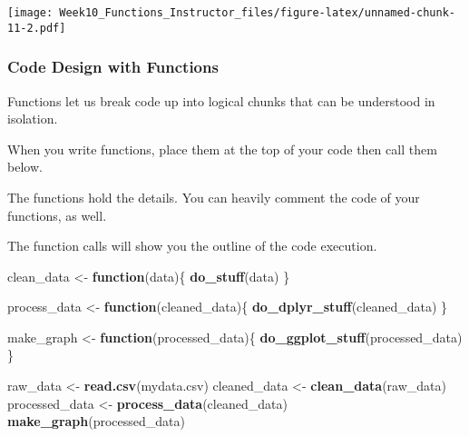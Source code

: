 \documentclass[
]{article}
\newenvironment{Shaded}{\begin{snugshade}}{\end{snugshade}}
\newcommand{\ControlFlowTok}[1]{\textcolor[rgb]{0.13,0.29,0.53}{\textbf{#1}}}
\newcommand{\FunctionTok}[1]{\textcolor[rgb]{0.13,0.29,0.53}{\textbf{#1}}}
\newcommand{\NormalTok}[1]{#1}
\newcommand{\OtherTok}[1]{\textcolor[rgb]{0.56,0.35,0.01}{#1}}
\newcommand{\StringTok}[1]{\textcolor[rgb]{0.31,0.60,0.02}{#1}}
\begin{document}
\texttt{[image: Week10\_Functions\_Instructor\_files/figure-latex/unnamed-chunk-11-2.pdf]}

\hypertarget{code-design-with-functions}{%
\subsubsection{Code Design with
Functions}\label{code-design-with-functions}}

Functions let us break code up into logical chunks that can be
understood in isolation.

When you write functions, place them at the top of your code then call
them below.

The functions hold the details. You can heavily comment the code of your
functions, as well.

The function calls will show you the outline of the code execution.

\begin{Shaded}
\begin{Highlighting}[]
\NormalTok{clean\_data }\OtherTok{\textless{}{-}} \ControlFlowTok{function}\NormalTok{(data)\{}
  \FunctionTok{do\_stuff}\NormalTok{(data)}
\NormalTok{\}}

\NormalTok{process\_data }\OtherTok{\textless{}{-}} \ControlFlowTok{function}\NormalTok{(cleaned\_data)\{}
  \FunctionTok{do\_dplyr\_stuff}\NormalTok{(cleaned\_data)}
\NormalTok{\}}

\NormalTok{make\_graph }\OtherTok{\textless{}{-}} \ControlFlowTok{function}\NormalTok{(processed\_data)\{}
  \FunctionTok{do\_ggplot\_stuff}\NormalTok{(processed\_data)}
\NormalTok{\}}

\NormalTok{raw\_data }\OtherTok{\textless{}{-}} \FunctionTok{read.csv}\NormalTok{(}\StringTok{\textquotesingle{}mydata.csv\textquotesingle{}}\NormalTok{)}
\NormalTok{cleaned\_data }\OtherTok{\textless{}{-}} \FunctionTok{clean\_data}\NormalTok{(raw\_data)}
\NormalTok{processed\_data }\OtherTok{\textless{}{-}} \FunctionTok{process\_data}\NormalTok{(cleaned\_data)}
\FunctionTok{make\_graph}\NormalTok{(processed\_data)}
\end{Highlighting}
\end{Shaded}
\end{document}

